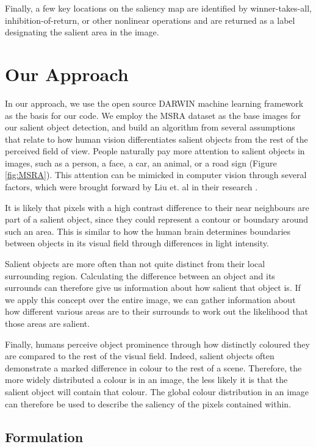 \documentclass[10pt,twocolumn,letterpaper]{article}
\begin{document}
Finally, a few key locations on the saliency map are identified by winner-takes-all, inhibition-of-return, or other nonlinear operations and are returned as a label designating the salient area in the image.

\section{Our Approach}
In our approach, we use the open source DARWIN machine learning framework \cite{drwn} as the basis for our code. We employ the MSRA dataset as the base images for our salient object detection, and build an algorithm from several assumptions that relate to how human vision differentiates salient objects from the rest of the perceived field of view.  People naturally pay more attention to salient objects in images, such as a person, a face, a car, an animal, or a road sign (Figure \ref{fig:MSRA}). This attention can be mimicked in computer vision through several factors, which were brought forward by Liu et. al in their research \cite{sal2007}\cite{sal2011}.

It is likely that pixels with a high contrast difference to their near neighbours are part of a salient object, since they could represent a contour or boundary around such an area.  This is similar to how the human brain determines boundaries between objects in its visual field through differences in light intensity.

Salient objects are more often than not quite distinct from their local surrounding region.  Calculating the difference between an object and its surrounds can therefore give us information about how salient that object is.  If we apply this concept over the entire image, we can gather information about how different various areas are to their surrounds to work out the likelihood that those areas are salient.

Finally, humans perceive object prominence through how distinctly coloured they are compared to the rest of the visual field.  Indeed, salient objects often demonstrate a marked difference in colour to the rest of a scene.  Therefore, the more widely distributed a colour is in an image, the less likely it is that the salient object will contain that colour.  The global colour distribution in an image can therefore be used to describe the saliency of the pixels contained within.

\subsection{Formulation}
\end{document}
